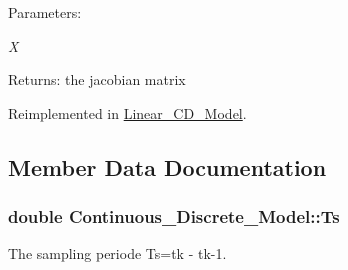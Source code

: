 \begin{Desc}
\item[Parameters:]
\begin{description}
\item[{\em X}]\end{description}
\end{Desc}
\begin{Desc}
\item[Returns:]the jacobian matrix \end{Desc}


Reimplemented in \hyperlink{class_linear___c_d___model_6d063fdeaeba656c8449e1539f422e1a}{Linear\_\-CD\_\-Model}.

\subsection{Member Data Documentation}
\hypertarget{class_continuous___discrete___model_060335cf774016bc41c12a1c8421628c}{
\subsubsection[{Ts}]{\setlength{\rightskip}{0pt plus 5cm}double {\bf Continuous\_\-Discrete\_\-Model::Ts}}}
\label{class_continuous___discrete___model_060335cf774016bc41c12a1c8421628c}


The sampling periode Ts=tk - tk-1. 

